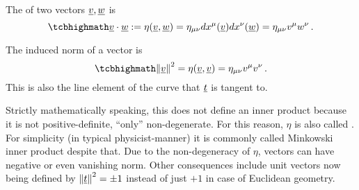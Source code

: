 \documentclass[../relativity_main.tex]{subfiles}
\begin{document}
\begin{defi}
The  of two vectors $\underline{v}, \underline{w}$ is
\begin{equation}\label{eq:inner_prod}
	\eqbox{
	\fvec{v} \cdot \fvec{w} := \eta(\fvec{v}, \fvec{w}) = \eta_{\mu \nu} dx^\mu(\fvec{v}) dx^\nu(\fvec{w}) = \eta_{\mu \nu} v^\mu w^\nu
	} \, .
\end{equation}

The induced norm of a vector is
\begin{equation}\label{eq:vector_norm}
	\eqbox{
	\norm{\fvec{v}}^2 = \eta(\fvec{v}, \fvec{v}) = \eta_{\mu \nu} v^\mu v^\nu
	} \, .
\end{equation}
This is also the line element of the curve that $\underline{t}$ is tangent to.
\iffalse
Based on that, a general way to define the distance between events $E_1$ at $\fvec{x_1} = (ct_1, x_1, y_1, z_1)$ and $E_2$ at $\fvec{x_2} = (ct_2, x_2, y_2, z_2)$ in an inertial Cartesian frame is
\begin{equation}
	\eqbox{
	\begin{split}
	d(E_1, E_2) &= \sqrt{(x_2 - x_1)^2 + (y_2 - y_1)^2 + (z_2 - z_1)^2 - c^2 (t_2 - t_1)^2}
	\\
	&= c \, \sqrt{- \tau_{E_1, E_2}^2} = \eta_{\mu \nu} (x_1^\mu - x_2^\mu) (x_1^\nu - x_2^\nu)
	\\
	&= \min_{\Gamma: \; \Gamma(a) = E_1, \Gamma(b) = E_2} L(\Gamma)
	= \min_{\Gamma: \; \Gamma(a) = E_1, \Gamma(b) = E_2} \int_\Gamma ds
	\end{split}
	}
\end{equation}
i.e.~as the (proper) length of the straight world line connecting them.
\fi
\end{defi}
Strictly mathematically speaking, this does not define an inner product because it is not positive-definite, \enquote{only} non-degenerate. For this reason, $\eta$ is also called . For simplicity (in typical physicist-manner) it is commonly called Minkowski inner product despite that. Due to the non-degeneracy of $\eta$, vectors can have negative or even vanishing norm. Other consequences include unit vectors now being defined by $\norm{\underline{t}}^2 = \pm 1$ instead of just $+ 1$ in case of Euclidean geometry.
\end{document}
